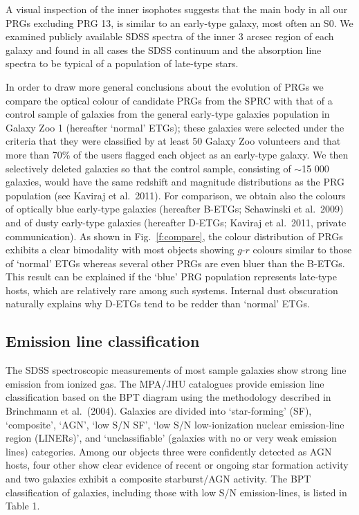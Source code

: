 \documentclass[useAMS,usenatbib]{mn2e}
\begin{document}
A visual inspection of the inner isophotes suggests that the main body in all our PRGs excluding PRG 13, is similar to an early-type galaxy, most often an S0.
We examined publicly available SDSS spectra of the inner 3 arcsec region of each galaxy and found in all cases the SDSS continuum and the absorption line spectra to be typical of a population of late-type stars.

In order to draw more general conclusions about the evolution of PRGs we compare the optical colour of candidate PRGs from the SPRC with that of a control sample of galaxies from the general early-type galaxies population in Galaxy Zoo 1 (hereafter `normal' ETGs);
these galaxies were selected under the criteria that they were classified by at least 50 Galaxy Zoo volunteers and that more than 70\% of the users flagged each object as an early-type galaxy. 
We then selectively deleted galaxies so that the control sample, consisting of $\sim$15 000 galaxies, would have the same redshift and magnitude distributions as the PRG population (see Kaviraj et al.\ 2011).
For comparison, we obtain also the colours of optically blue early-type galaxies (hereafter B-ETGs; Schawinski et al.\ 2009) and of dusty early-type galaxies (hereafter D-ETGs; Kaviraj et al.\ 2011, private communication).
As shown in Fig.\ \ref{f:compare}, the colour distribution of PRGs exhibits a clear bimodality with most objects showing $g$-$r$ colours similar to those of `normal' ETGs whereas several other PRGs are even bluer than the B-ETGs. This result can be explained if the `blue' PRG population represents late-type hosts, which are relatively rare among such systems. Internal dust obscuration naturally explains why D-ETGs tend to be redder than `normal' ETGs.

\subsection{Emission line classification}
The SDSS spectroscopic measurements of most sample galaxies show strong line emission from ionized gas.
The MPA/JHU catalogues provide emission line classification based on the BPT diagram using the methodology described in Brinchmann et al.\ (2004). Galaxies are divided into `star-forming' (SF), `composite', `AGN', `low S/N SF', `low S/N low-ionization nuclear emission-line region (LINERs)', and `unclassifiable' (galaxies with no or very weak emission lines) categories.
Among our objects three were confidently detected as AGN hosts, four other show clear evidence of recent or ongoing star formation activity and two galaxies exhibit a composite starburst/AGN activity. 
The BPT classification of galaxies, including those with low S/N emission-lines, is listed in Table 1. 
\end{document}

